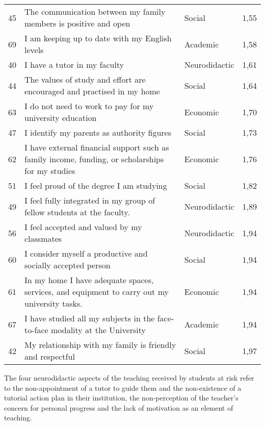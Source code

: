 \documentclass[english]{textolivre}
\begin{document}
\begin{table}[htbp]
\begin{threeparttable}
\begin{tabular}{p{1cm} p{7cm} p{2cm} p{2cm}}
45 & The communication between my family members is positive and open & Social & 1,55 \\
69 & I am keeping up to date with my English levels
 & Academic & 1,58 \\
40 & I have a tutor in my faculty & Neurodidactic & 1,61 \\
44 & The values of study and effort are encouraged and practised in my home & Social & 1,64 \\
63 & I do not need to work to pay for my university education & Economic & 1,70 \\
47 & I identify my parents as authority figures & Social & 1,73 \\
62 & I have external financial support such as family income, funding, or scholarships for my studies & Economic
& 1,76 \\
51 & I feel proud of the degree I am studying & Social & 1,82 \\
49 & I feel fully integrated in my group of fellow students at the faculty. & Neurodidactic & 1,89 \\
56 & I feel accepted and valued by my classmates & Neurodidactic & 1,94 \\
60 & I consider myself a productive and socially accepted person & Social & 1,94 \\
61 & In my home I have adequate spaces, services, and equipment to carry out my university tasks. & Economic & 1,94 \\
67 & I have studied all my subjects in the face-to-face modality at the University & Academic & 1,94 \\
42 & My relationship with my family is friendly and respectful & Social & 1,97 \\
\bottomrule
\end{tabular}
\end{threeparttable}
\end{table}

The four neurodidactic aspects of the teaching received by students at risk refer to the non-appointment of a tutor to guide them and the non-existence of a tutorial action plan in their institution, the non-perception of the teacher's concern for personal progress and the lack of motivation as an element of teaching.
\end{document}
